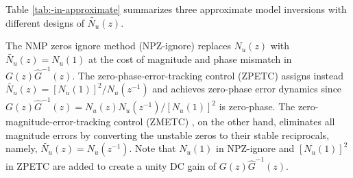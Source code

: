 \documentclass [11pt, proquest] {uwthesis}[2020/02/24]
\begin{document}
Table \ref{tab:-in-approximate} summarizes three approximate model
inversions with different designs of $\tilde{N_{u}}(z)$. 
\begin{table}
\caption{\label{tab:-in-approximate}$\tilde{N_{u}}(z)$, $G(z)\hat{G}^{-1}(z)$,
and $\frac{Y(z)}{R(z)}$ in approximate model inversions. $Y(z)$
and $R(z)$ are transfer functions of the output and reference signals
shown in Fig. \ref{fig:Block-diagram-for-1}.}

\end{table}
The NMP zeros ignore method (NPZ-ignore) \cite{butterworth_analysis_2012,Butterworth2008}
replaces $N_{u}(z)$ with $\tilde{N_{u}}(z)=N_{u}(1)$ at the cost
of magnitude and phase mismatch in $G(z)\hat{G}^{-1}(z)$. The zero-phase-error-tracking
control (ZPETC) \cite{Tomizuka1987} assigns instead $\tilde{N_{u}}(z)=[N_{u}(1)]^{2}/N_{u}(z^{-1})$
and achieves zero-phase error dynamics since $G(z)\hat{G}^{-1}(z)=N_{u}(z)N_{u}(z^{-1})/[N_{u}(1)]^{2}$
is zero-phase. The zero-magnitude-error-tracking control (ZMETC) \cite{butterworth_analysis_2012},
on the other hand, eliminates all magnitude errors by converting the
unstable zeros to their stable reciprocals, namely, $\tilde{N_{u}}(z)=N_{u}(z^{-1})$.
Note that $N_{u}(1)$ in NPZ-ignore and $[N_{u}(1)]^{2}$ in ZPETC
are added to create a unity DC gain of $G(z)\hat{G}^{-1}(z)$.
\end{document}
